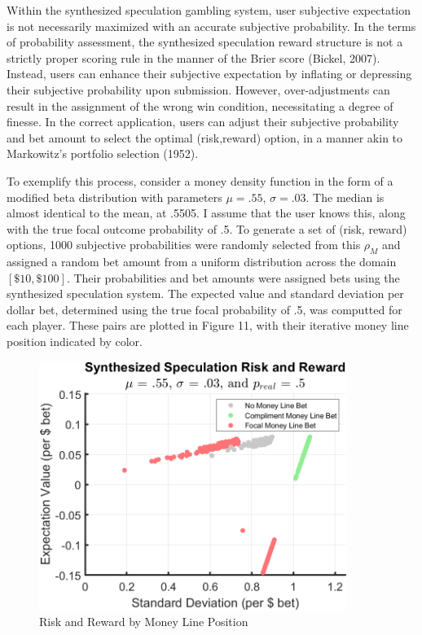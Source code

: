 \documentclass[sn-mathphys-num]{sn-jnl}
\theoremstyle{thmstyleone}%
\theoremstyle{thmstyletwo}%
\theoremstyle{thmstylethree}%
\begin{document}
Within the synthesized speculation gambling system, user subjective expectation is not necessarily maximized with an accurate subjective probability. In the terms of probability assessment, the synthesized speculation reward structure is not a strictly proper scoring rule in the manner of the Brier score (Bickel, 2007). Instead, users can enhance their subjective expectation by inflating or depressing their subjective probability upon submission. However, over-adjustments can result in the assignment of the wrong win condition, necessitating a degree of finesse. In the correct application, users can adjust their subjective probability and bet amount to select the optimal (risk,reward) option, in a manner akin to Markowitz's portfolio selection (1952).

To exemplify this process, consider a money density function in the form of a modified beta distribution with parameters $\mu = .55$, $\sigma = .03$. The median is almost identical to the mean, at .5505. I assume that the user knows this, along with the true focal outcome probability of .5. To generate a set of (risk, reward) options, 1000 subjective probabilities were randomly selected from this $\rho_M$ and assigned a random bet amount from a uniform distribution across the domain $[\$10, \$100]$. Their probabilities and bet amounts were assigned bets using the synthesized speculation system. The expected value and standard deviation per dollar bet, determined using the true focal probability of .5, was computted for each player. These pairs are plotted in Figure 11, with their iterative money line position indicated by color.

\begin{figure}[H]
	\centering
	\includegraphics[width=10cm]{E_vs_V_Categories}
	\caption{Risk and Reward by Money Line Position}
\end{figure}
\end{document}
